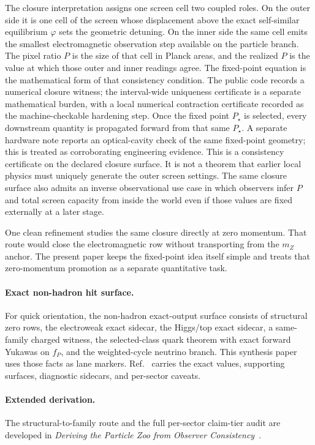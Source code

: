 The closure interpretation assigns one screen cell two coupled roles. On the outer side it is one
cell of the screen whose displacement above the exact self-similar equilibrium \(\varphi\) sets
the geometric detuning. On the inner side the same cell emits the smallest electromagnetic
observation step available on the particle branch. The pixel ratio \(P\) is the size of that cell
in Planck areas, and the realized \(P\) is the value at which those outer and inner readings
agree. The fixed-point equation is the mathematical form of that consistency condition. The public
code records a numerical closure witness; the interval-wide uniqueness certificate is a
separate mathematical burden, with a local numerical contraction certificate recorded as the
machine-checkable hardening step. Once the fixed point \(P_\star\) is selected, every downstream
quantity is propagated forward from that same \(P_\star\).
A separate hardware note reports an optical-cavity check of the same fixed-point geometry;
this is treated as corroborating engineering evidence.
This is a consistency certificate on the declared closure surface. It is not a theorem that earlier
local physics must uniquely generate the outer screen settings. The same closure surface also
admits an inverse observational use case in which observers infer \(P\) and total screen capacity
from inside the world even if those values are fixed externally at a later stage.

One clean refinement studies the same closure directly at zero momentum. That route would close the
electromagnetic row without transporting from the \(m_Z\) anchor. The present paper keeps the
fixed-point idea itself simple and treats that zero-momentum promotion as a separate quantitative
task.

\paragraph{Exact non-hadron hit surface.}
For quick orientation, the non-hadron exact-output surface consists of structural zero rows,
the electroweak exact sidecar, the Higgs/top exact sidecar, a same-family charged witness, the
selected-class quark theorem with exact forward Yukawas on \(f_P\), and the weighted-cycle
neutrino branch. This synthesis paper uses those facts as lane markers. Ref.~\cite{ophparticles}
carries the exact values, supporting surfaces, diagnostic sidecars, and per-sector caveats.

\paragraph{Extended derivation.}
The structural-to-family route and the full per-sector claim-tier audit are developed in
\emph{Deriving the Particle Zoo from Observer Consistency}~\cite{ophparticles}.

